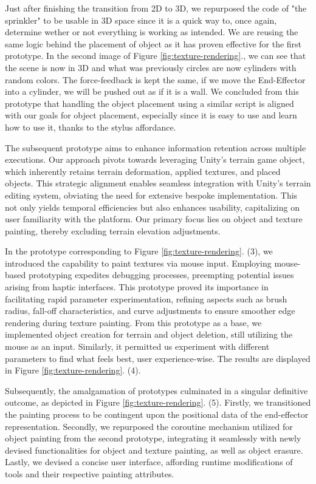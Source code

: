 Just after finishing the transition from 2D to 3D, we repurposed the code of "the sprinkler" to be usable in 3D space since it is a quick way to, once again, determine wether or not everything is working as intended.
We are reusing the same logic behind the placement of object as it has proven effective for the first prototype.
In the second image of Figure \ref{fig:texture-rendering}., we can see that the scene is now in 3D and what was previously circles are now cylinders with random colors.
The force-feedback is kept the same, if we move the End-Effector into a cylinder, we will be pushed out as if it is a wall.
We concluded from this prototype that handling the object placement using a similar script is aligned with our goals for object placement, especially since it is easy to use and learn how to use it, thanks to the stylus affordance. 

The subsequent prototype aims to enhance information retention across multiple executions. 
Our approach pivots towards leveraging Unity's terrain game object, which inherently retains terrain deformation, applied textures, and placed objects. 
This strategic alignment enables seamless integration with Unity's terrain editing system, obviating the need for extensive bespoke implementation. 
This not only yields temporal efficiencies but also enhances usability, capitalizing on user familiarity with the platform. 
Our primary focus lies on object and texture painting, thereby excluding terrain elevation adjustments. 

In the prototype corresponding to Figure \ref{fig:texture-rendering}. (3), we introduced the capability to paint textures via mouse input. 
Employing mouse-based prototyping expedites debugging processes, preempting potential issues arising from haptic interfaces. 
This prototype proved its importance in facilitating rapid parameter experimentation, refining aspects such as brush radius, fall-off characteristics, and curve adjustments to ensure smoother edge rendering during texture painting.
From this prototype as a base, we implemented object creation for terrain and object deletion, still utilizing the mouse as an input.
Similarly, it permitted us experiment with different parameters to find what feels best, user experience-wise. 
The results are displayed in Figure \ref{fig:texture-rendering}. (4).

Subsequently, the amalgamation of prototypes culminated in a singular definitive outcome, as depicted in Figure \ref{fig:texture-rendering}. (5).
Firstly, we transitioned the painting process to be contingent upon the positional data of the end-effector representation. 
Secondly, we repurposed the coroutine mechanism utilized for object painting from the second prototype, integrating it seamlessly with newly devised functionalities for object and texture painting, as well as object erasure. 
Lastly, we devised a concise user interface, affording runtime modifications of tools and their respective painting attributes.

